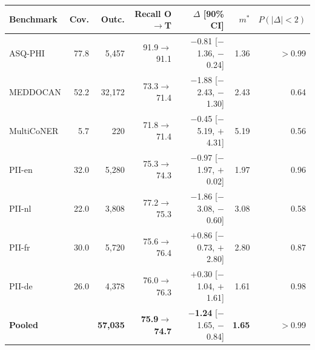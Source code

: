 \begin{tabular}{lrrrrrr}
\toprule
Benchmark & Cov. & Outc. & Recall O$\rightarrow$T & $\Delta$ [90\% CI] & $m^\ast$ & $P(|\Delta|{<}2)$\\
\midrule
ASQ-PHI & 77.8 & 5{,}457 & 91.9$\rightarrow$91.1 & $-$0.81 [$-$1.36, $-$0.24] & 1.36 & $>$0.99\\
MEDDOCAN & 52.2 & 32{,}172 & 73.3$\rightarrow$71.4 & $-$1.88 [$-$2.43, $-$1.30] & 2.43 & 0.64\\
MultiCoNER & 5.7 & 220 & 71.8$\rightarrow$71.4 & $-$0.45 [$-$5.19, $+$4.31] & 5.19 & 0.56\\
PII-en & 32.0 & 5{,}280 & 75.3$\rightarrow$74.3 & $-$0.97 [$-$1.97, $+$0.02] & 1.97 & 0.96\\
PII-nl & 22.0 & 3{,}808 & 77.2$\rightarrow$75.3 & $-$1.86 [$-$3.08, $-$0.60] & 3.08 & 0.58\\
PII-fr & 30.0 & 5{,}720 & 75.6$\rightarrow$76.4 & $+$0.86 [$-$0.73, $+$2.80] & 2.80 & 0.87\\
PII-de & 26.0 & 4{,}378 & 76.0$\rightarrow$76.3 & $+$0.30 [$-$1.04, $+$1.61] & 1.61 & 0.98\\
\midrule
\textbf{Pooled} & & \textbf{57{,}035} & \textbf{75.9$\rightarrow$74.7} & \textbf{$-$1.24} [$-$1.65, $-$0.84] & \textbf{1.65} & $>$0.99\\
\bottomrule
\end{tabular}
